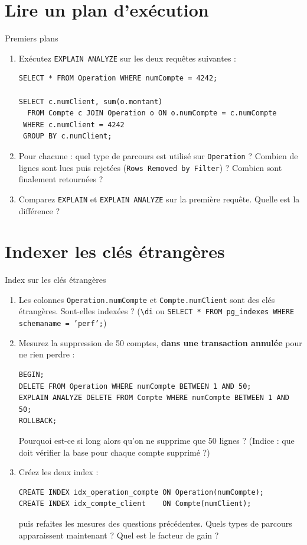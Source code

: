 \documentclass[11pt]{article}
\begin{document}
\section{Lire un plan d'ex\'ecution}

\begin{exobox}{Premiers plans}
\begin{enumerate}[label=\alph*)]
  \item Ex\'ecutez \texttt{EXPLAIN ANALYZE} sur les deux requ\^etes suivantes :
\begin{lstlisting}
SELECT * FROM Operation WHERE numCompte = 4242;

SELECT c.numClient, sum(o.montant)
  FROM Compte c JOIN Operation o ON o.numCompte = c.numCompte
 WHERE c.numClient = 4242
 GROUP BY c.numClient;
\end{lstlisting}
  \item Pour chacune : quel type de parcours est utilis\'e sur \texttt{Operation} ? Combien de lignes sont lues
        puis rejet\'ees (\texttt{Rows Removed by Filter}) ? Combien sont finalement retourn\'ees ?
  \item Comparez \texttt{EXPLAIN} et \texttt{EXPLAIN ANALYZE} sur la premi\`ere requ\^ete. Quelle est la diff\'erence ?
\end{enumerate}
\end{exobox}

\section{Indexer les cl\'es \'etrang\`eres}

\begin{exobox}{Index sur les cl\'es \'etrang\`eres}
\begin{enumerate}[label=\alph*)]
  \item Les colonnes \texttt{Operation.numCompte} et \texttt{Compte.numClient} sont des cl\'es \'etrang\`eres.
        Sont-elles index\'ees ? (\texttt{\textbackslash di} ou \texttt{SELECT * FROM pg\_indexes WHERE schemaname = 'perf';})
  \item Mesurez la suppression de 50 comptes, \textbf{dans une transaction annul\'ee} pour ne rien perdre :
\begin{lstlisting}
BEGIN;
DELETE FROM Operation WHERE numCompte BETWEEN 1 AND 50;
EXPLAIN ANALYZE DELETE FROM Compte WHERE numCompte BETWEEN 1 AND 50;
ROLLBACK;
\end{lstlisting}
        Pourquoi est-ce si long alors qu'on ne supprime que 50 lignes ? (Indice : que doit v\'erifier la base
        pour chaque compte supprim\'e ?)
  \item Cr\'eez les deux index :
\begin{lstlisting}
CREATE INDEX idx_operation_compte ON Operation(numCompte);
CREATE INDEX idx_compte_client    ON Compte(numClient);
\end{lstlisting}
        puis refaites les mesures des questions pr\'ec\'edentes. Quels types de parcours apparaissent maintenant ?
        Quel est le facteur de gain ?
\end{enumerate}
\end{exobox}
\end{document}

